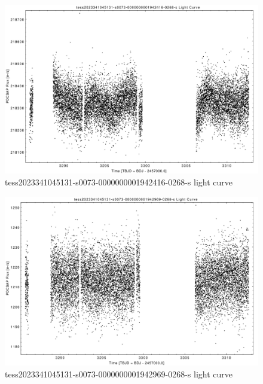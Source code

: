 \documentclass[a4paper,12pt]{article}
\begin{document}
\begin{figure}[htbp]
    \centering
    \includegraphics[width = 1\textwidth]{
      lightcurves/tess2023341045131-s0073-0000000001942416-0268-s.pdf}
    \caption{tess2023341045131-s0073-0000000001942416-0268-s light curve}
\end{figure}
\begin{figure}[htbp]
    \centering
    \includegraphics[width = 1\textwidth]{
      lightcurves/tess2023341045131-s0073-0000000001942969-0268-s.pdf}
    \caption{tess2023341045131-s0073-0000000001942969-0268-s light curve}
\end{figure}
\end{document}
